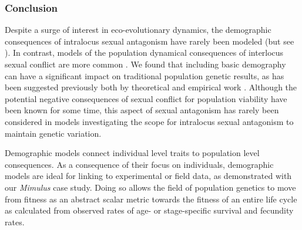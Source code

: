 \documentclass[11pt,draft]{article}
\begin{document}
\subsubsection*{Conclusion} 

Despite a surge of interest in eco-evolutionary dynamics, the demographic consequences of intralocus sexual antagonism have rarely been modeled (but see \citealt{harts2014demography,kokko2003sexy, MatthewsConnallon2019}). In contrast, models of the population dynamical consequences of interlocus sexual conflict are more common \citep[e.g.,][]{tanaka1996sexual, martinez2017sexual}. We found that including basic demography can have a significant impact on traditional population genetic results, as has been suggested previously both by theoretical and empirical work \citep{kokko2003sexy, berger2016intralocus, grieshop2017male}. Although the potential negative consequences of sexual conflict for population viability have been known for some time, this aspect of sexual antagonism has rarely been considered in models investigating the scope for intralocus sexual antagonism to maintain genetic variation. 

Demographic models connect individual level traits to population level consequences. As a consequence of their focus on individuals, demographic models are ideal for linking to experimental or field data, as demonstrated with our \textit{Mimulus} case study. Doing so allows the field of population genetics to move from fitness as an abstract scalar metric towards the fitness of an entire life cycle as calculated from observed rates of age- or stage-specific survival and fecundity rates.  



 









\end{document}
